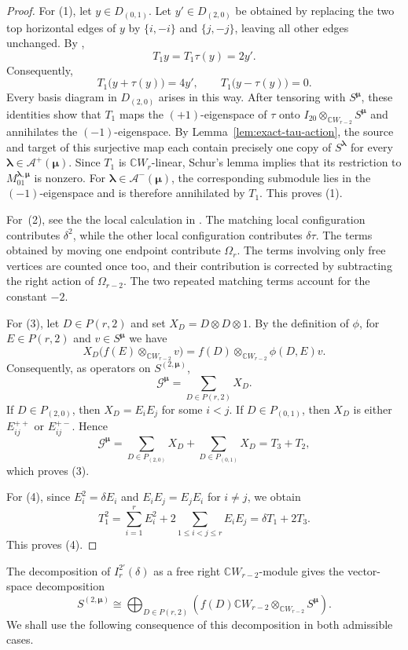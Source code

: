 \documentclass[10pt,a4paper]{amsart}
\newcommand{\C}{\mathbb{C}}
\newcommand{\1}{\mathfrak{1}}
\begin{document}
\begin{proof}
For (1), let $y\in D_{(0,1)}$. Let $y'\in D_{(2,0)}$ be obtained by replacing the two top horizontal edges
of $y$ by $\{i,-i\}$ and $\{j,-j\}$, leaving all other edges unchanged. By \cite[Lemma~5.2]{KCTprevious},
$$
T_1y=T_1\tau(y)=2y'.
$$
Consequently,
$$
T_1\bigl(y+\tau(y)\bigr)=4y',
\qquad
T_1\bigl(y-\tau(y)\bigr)=0.
$$
Every basis diagram in $D_{(2,0)}$ arises in this way. After tensoring with $S^{\bm\mu}$, these identities show that $T_1$ maps the $(+1)$-eigenspace of $\tau$ onto $I_{20}\otimes_{\C W_{r-2}}S^{\bm\mu}$ and annihilates the $(-1)$-eigenspace. By Lemma~\ref{lem:exact-tau-action}, the source and target of this surjective map each contain precisely
one copy of $S^{\bm\lambda}$ for every
$\bm\lambda\in\mathcal A^+(\bm\mu)$. Since $T_1$ is $\C W_r$-linear, Schur's lemma implies that its
restriction to $M_{01}^{\bm\lambda,\bm\mu}$ is nonzero. For $\bm\lambda\in\mathcal A^-(\bm\mu)$, the corresponding submodule lies in the $(-1)$-eigenspace and is therefore annihilated by $T_1$. This proves (1).

For~(2), see the the local calculation in \cite[Proposition~5.3]{KCTprevious}. The matching local configuration contributes $\delta^2$, while the other local configuration contributes $\delta\tau$. The terms obtained by moving one endpoint contribute $\Omega_r$. The terms involving only free vertices are counted once too, and their contribution is corrected by subtracting the right action of $\Omega_{r-2}$. The two repeated matching terms account for the constant $-2$.

For (3), let $D\in P(r,2)$ and set $X_D=D\otimes D\otimes1$. By the definition of $\phi$, for $E\in P(r,2)$ and $v\in S^{\bm\mu}$ we have
$$
X_D\bigl(f(E)\otimes_{\C W_{r-2}}v\bigr)=f(D)\otimes_{\C W_{r-2}}\phi(D,E)v.
$$
Consequently, as operators on $S^{(2,\bm\mu)}$,
$$
\mathcal G^{\bm\mu}=\sum_{D\in P(r,2)}X_D.
$$
If $D\in P_{(2,0)}$, then $X_D=E_iE_j$ for some
$i<j$. If $D\in P_{(0,1)}$, then $X_D$ is either
$E_{ij}^{++}$ or $E_{ij}^{+-}$. Hence
$$
\mathcal G^{\bm\mu}=\sum_{D\in P_{(2,0)}}X_D+\sum_{D\in P_{(0,1)}}X_D=T_3+T_2,
$$
which proves (3).

For (4), since $E_i^2=\delta E_i$ and
$E_iE_j=E_jE_i$ for $i\neq j$, we obtain
$$
T_1^2 =\sum_{i=1}^rE_i^2
+2\sum_{1\leq i<j\leq r}E_iE_j
=\delta T_1+2T_3.
$$
This proves (4).
\end{proof}

The decomposition of $I_r^{2'}(\delta)$ as a free right $\C W_{r-2}$-module gives the vector-space decomposition
\begin{equation}\label{eq:exact-cell-direct-sum}
S^{(2,\bm\mu)}\cong \bigoplus_{D\in P(r,2)} \left(f(D)\C W_{r-2}\otimes_{\C W_{r-2}}S^{\bm\mu}
\right).
\end{equation}
We shall use the following consequence of this decomposition in both admissible cases.
\end{document}
